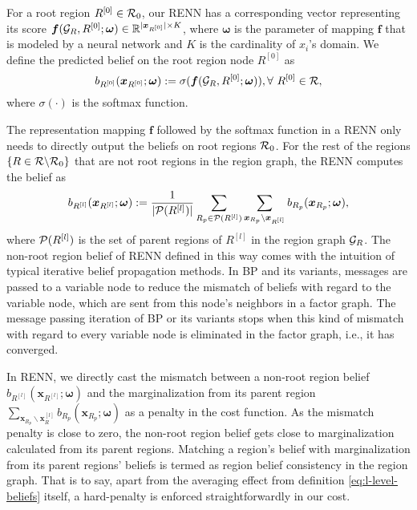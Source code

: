 For a root region $R^{[0]}\in \mathcal{R}_0$, our RENN has a corresponding vector representing its score $\bm{f}(\mathcal{G}_R, R^{[0]}; \bm{\omega}) \in \mathbb{R}^{|{\bm{x}_{R^{[0]}}}| \times K}$, where $\bm{\omega}$ is the parameter of mapping $\bm{f}$ that is modeled by a neural network and $K$ is the cardinality of $x_i$'s domain. We define the predicted belief on the root region node $R^{[0]}$ as
\begin{equation}
  b_{R^{[0]}}(\bm{x}_{R^{[0]}}; \bm{\omega}) := \sigma(\bm{f}(\mathcal{G}_R, R^{[0]}; \bm{\omega})), \forall~ {R^{[0]}} \in \mathcal{R},
\end{equation}
where $\sigma(\cdot)$ is the softmax function.

The representation mapping $\bm{f}$ followed by the softmax function in a RENN only needs to directly output the beliefs on root regions $\mathcal{R}_0$.
For the rest of the regions $\left\{R \in \mathcal{R} \backslash \mathcal{R}_0 \right\}$ that are not root regions in the region graph, the RENN computes the belief as
\begin{equation}\label{eq:l-level-beliefs}
  b_{R^{[l]}}(\bm{x}_{R^{[l]}}; \bm{\omega}) := \frac{1}{|\mathcal{P}(R^{[l]})|} \sum_{R_p\in  \mathcal{P}(R^{[l]})}\sum_{\bm{x}_{R_p}\backslash \bm{x}_{R^{[l]}}} b_{R_p}(\bm{x}_{R_p}; \bm{\omega}),
\end{equation}
where $\mathcal{P}(R^{[l]})$ is the set of parent regions of $R^{[l]}$ in the region graph $\mathcal{G}_R$. The non-root region belief of RENN defined in this way comes with the intuition of typical iterative belief propagation methods. In BP and its variants, messages are passed to a variable node to reduce the mismatch of beliefs with regard to the variable node, which are sent from this node's neighbors in a factor graph. The message passing iteration of BP or its variants stops when this kind of mismatch with regard to every variable node is eliminated in the factor graph, i.e., it has converged.

In RENN, we directly cast the mismatch between a non-root region belief $b_{R^{[l]}}(\bm{x}_{R^{[l]}}; \bm{\omega})$ and the marginalization from its parent region $\sum_{\bm{x}_{R_p}\backslash \bm{x}_R^{[l]}}b_{R_p}(\bm{x}_{R_p}; \bm{\omega})$ as a penalty in the cost function. As the mismatch penalty is close to zero, the non-root region belief gets close to marginalization calculated from its parent regions. Matching a region's belief with marginalization from its parent regions' beliefs is termed as region belief consistency in the region graph. That is to say, apart from the averaging effect from definition \eqref{eq:l-level-beliefs} itself, a hard-penalty is enforced straightforwardly in our cost.

